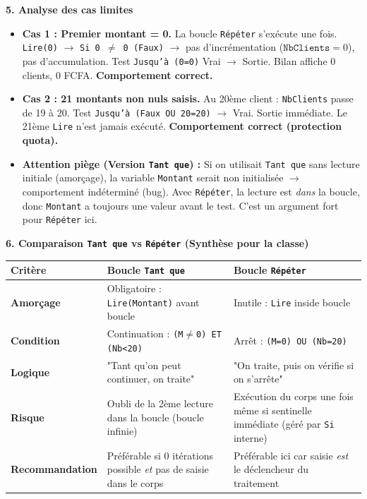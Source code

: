 \documentclass[11pt]{article}
\begin{document}
\begin{exoresolu}
\textbf{5. Analyse des cas limites}\par
\begin{itemize}
    \item \textbf{Cas 1 : Premier montant = 0.}
    La boucle \texttt{Répéter} s'exécute une fois. \texttt{Lire(0)} $\rightarrow$ \texttt{Si 0 $\neq$ 0 (Faux)} $\rightarrow$ pas d'incrémentation ($\texttt{NbClients}=0$), pas d'accumulation. Test \texttt{Jusqu'à (0=0)} Vrai $\rightarrow$ Sortie. Bilan affiche 0 clients, 0 FCFA. \textbf{Comportement correct.}
    \item \textbf{Cas 2 : 21 montants non nuls saisis.}
    Au 20ème client : \texttt{NbClients} passe de 19 à 20. Test \texttt{Jusqu'à (Faux OU 20=20)} $\rightarrow$ Vrai. Sortie immédiate. Le 21ème \texttt{Lire} n'est jamais exécuté. \textbf{Comportement correct (protection quota).}
    \item \textbf{Attention piège (Version \texttt{Tant que}) :} Si on utilisait \texttt{Tant que} sans lecture initiale (amorçage), la variable \texttt{Montant} serait non initialisée $\rightarrow$ comportement indéterminé (bug). Avec \texttt{Répéter}, la lecture est \emph{dans} la boucle, donc \texttt{Montant} a toujours une valeur avant le test. C'est un argument fort pour \texttt{Répéter} ici.
\end{itemize}

\textbf{6. Comparaison \texttt{Tant que} vs \texttt{Répéter} (Synthèse pour la classe)}\par
\begin{center}
\begin{tabularx}{\linewidth}{|l|X|X|}\hline
\textbf{Critère} & \textbf{Boucle \texttt{Tant que}} & \textbf{Boucle \texttt{Répéter}} \\\hline
\textbf{Amorçage} & Obligatoire : \texttt{Lire(Montant)} avant boucle & Inutile : \texttt{Lire} inside boucle \\\hline
\textbf{Condition} & Continuation : \texttt{(M$\neq$0) ET (Nb<20)} & Arrêt : \texttt{(M=0) OU (Nb=20)} \\\hline
\textbf{Logique} & "Tant qu'on peut continuer, on traite" & "On traite, puis on vérifie si on s'arrête" \\\hline
\textbf{Risque} & Oubli de la 2ème lecture dans la boucle (boucle infinie) & Exécution du corps une fois même si sentinelle immédiate (géré par \texttt{Si} interne) \\\hline
\textbf{Recommandation} & Préférable si 0 itérations possible \emph{et} pas de saisie dans le corps & Préférable ici car saisie \emph{est} le déclencheur du traitement \\\hline
\end{tabularx}
\end{center}
\end{exoresolu}
\end{document}
